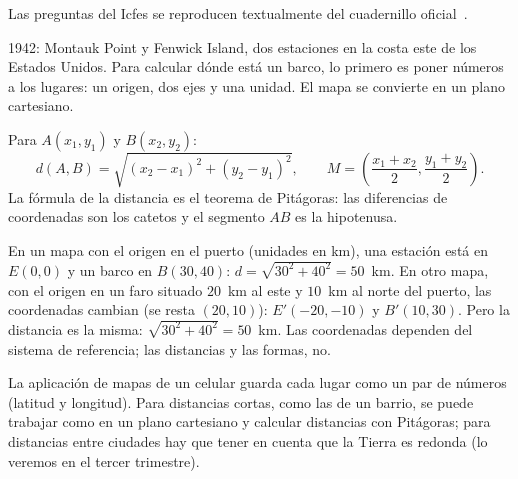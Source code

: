 \documentclass[11pt]{article}
\begin{document}
Las preguntas del Icfes se reproducen textualmente del cuadernillo
oficial~\cite{icfes2026}.

\label{tema:coordenadas}

\begin{hilo}
1942: Montauk Point y Fenwick Island, dos estaciones en la costa este de los
Estados Unidos. Para calcular dónde está un barco, lo primero es poner números a los
lugares: un origen, dos ejes y una unidad. El mapa se convierte en un plano cartesiano.
\end{hilo}

\begin{definicion}
Para $A(x_1, y_1)$ y $B(x_2, y_2)$:
\[
  d(A, B) = \sqrt{(x_2 - x_1)^2 + (y_2 - y_1)^2}, \qquad
  M = \left(\frac{x_1 + x_2}{2}, \frac{y_1 + y_2}{2}\right).
\]
La fórmula de la distancia es el teorema de Pitágoras: las diferencias de
coordenadas son los catetos y el segmento $AB$ es la hipotenusa.
\end{definicion}

\begin{ejemplo}
En un mapa con el origen en el puerto (unidades en km), una estación está en
$E(0, 0)$ y un barco en $B(30, 40)$: $d = \sqrt{30^2 + 40^2} = 50$~km. En otro mapa,
con el origen en un faro situado $20$~km al este y $10$~km al norte del puerto, las
coordenadas cambian (se resta $(20, 10)$): $E'(-20, -10)$ y $B'(10, 30)$. Pero la
distancia es la misma: $\sqrt{30^2 + 40^2} = 50$~km. Las coordenadas dependen del
sistema de referencia; las distancias y las formas, no.
\end{ejemplo}

\begin{aplicacion}
La aplicación de mapas de un celular guarda cada lugar como un par de números
(latitud y longitud). Para distancias cortas, como las de un barrio, se puede
trabajar como en un plano cartesiano y calcular distancias con Pitágoras; para
distancias entre ciudades hay que tener en cuenta que la Tierra es redonda (lo
veremos en el tercer trimestre).
\end{aplicacion}
\end{document}
